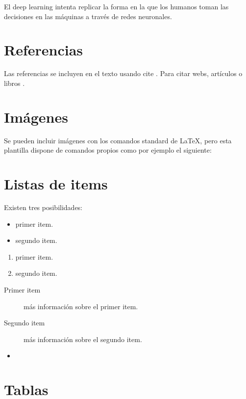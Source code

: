 El deep learning intenta replicar la forma en la que los humanos toman las decisiones en las máquinas a través de redes neuronales.



\section{Referencias}

Las referencias se incluyen en el texto usando cite \cite{wiki:latex}. Para citar webs, artículos o libros \cite{koza92}.

\section{Imágenes}

Se pueden incluir imágenes con los comandos standard de \LaTeX, pero esta plantilla dispone de comandos propios como por ejemplo el siguiente:

\section{Listas de items}

Existen tres posibilidades:

\begin{itemize}
	\item primer item.
	\item segundo item.
\end{itemize}

\begin{enumerate}
	\item primer item.
	\item segundo item.
\end{enumerate}

\begin{description}
	\item[Primer item] más información sobre el primer item.
	\item[Segundo item] más información sobre el segundo item.
\end{description}
	
\begin{itemize}
\item 
\end{itemize}

\section{Tablas}

